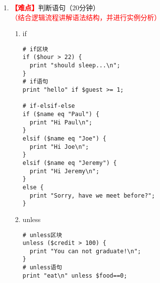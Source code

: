 \documentclass{TIJMUjiaoanLL}
\begin{document}
\begin{enumerate}
\begin{verbatim}
# 删除变量末尾的（多个）换行符，返回删除的换行符的个数
chomp $name;
chomp @authors;

# joining a number of strings togother with a colon delimiter
$fields = join ':', $data_field1, $data_field2, $data_field3;

# splitting a string into substrings
($field1, $field2) = split /:/, 'Hello:World', 2;
# splitting a scalar and creating an array
@fields = split /:/, $raw_data;

# open the file and slurp its contents into an array 
# and then close the file
open(FILE, "/etc/passwd");
@filedata = <FILE>;
close(FILE);

open my $IN, '<', $file_in or die "$0 : failed to open 
  input file '$file_in' : $!\n";
while(<$IN>){
  chomp;
  actions;
}
close $IN or warn "$0 : failed to close input file 
  '$file_in' : $!\n";

# Global variable $name is given a name
$name = "Paul";
# Enter our loop
foreach (@filedata) {
  # declare a new variable for just the loop
    my $current_file;
    # create a local version of name to temporarily 
    # assign values within the loop to
    local $name；
    ...
}
\end{verbatim}
  \vspace*{-10pt}


\otherTail
\newpage
\otherHeader


  \item \textcolor{red}{\textbf{【难点】}}判断语句（20分钟）\textcolor{red}{（结合逻辑流程讲解语法结构，并进行实例分析）}
    \begin{enumerate}
      \item if
\vspace*{-3pt}
\begin{verbatim}
# if区块
if ($hour > 22) {
  print "should sleep...\n";
}
# if语句
print "hello" if $guest >= 1;

# if-elsif-else
if ($name eq "Paul") {
  print "Hi Paul\n";
}
elsif ($name eq "Joe") {
  print "Hi Joe\n";
}
elsif ($name eq "Jeremy") {
  print "Hi Jeremy\n";
}
else {
  print "Sorry, have we meet before?";
}
\end{verbatim}
\vspace*{-3pt}
      \item unless
\vspace*{-13pt}
\begin{multicols}{2}
\begin{verbatim}
# unless区块
unless ($credit > 100) {
  print "You can not graduate!\n";
}
# unless语句
print "eat\n" unless $food==0;


\end{verbatim}
\end{multicols}
\end{enumerate}
\end{enumerate}
\end{document}
